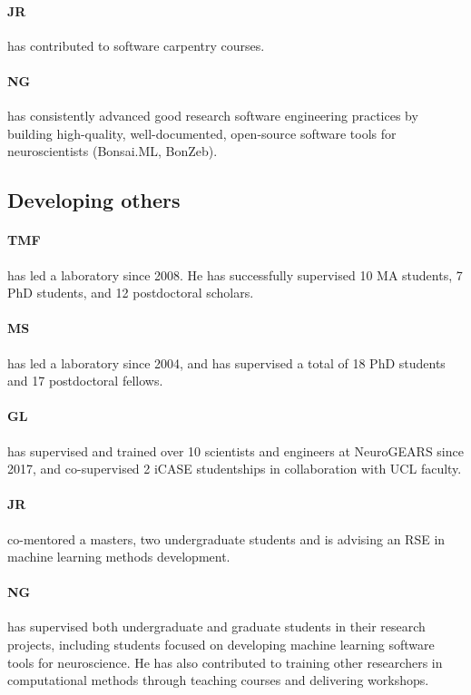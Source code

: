 \paragraph{JR} has contributed to software carpentry courses.

\paragraph{NG} has consistently advanced good research software engineering practices by building high-quality, well-documented, open-source software tools for neuroscientists (Bonsai.ML, BonZeb).


\subsection{Developing others}

\paragraph{TMF} has led a laboratory since 2008. He has
successfully supervised 10 MA students, 7 PhD students, and 12 postdoctoral
scholars.

\paragraph{MS} has led a laboratory since 2004, and has supervised a total of 18 PhD students and
17 postdoctoral fellows.

\paragraph{GL} has supervised and trained over 10 scientists and engineers at NeuroGEARS since 2017, and co-supervised 2 iCASE studentships in collaboration with UCL faculty.

\paragraph{JR} co-mentored a masters, two undergraduate
students and is advising an RSE in machine learning methods development.

\paragraph{NG} has supervised both undergraduate and graduate students in their research projects, including students focused on developing machine learning software tools for neuroscience. He has also contributed to training other researchers in computational methods through teaching courses and delivering workshops.